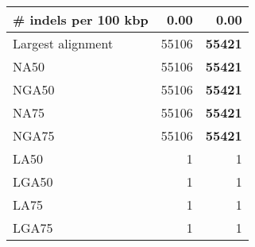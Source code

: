 \documentclass[12pt,a4paper]{article}
\begin{document}
\begin{table}[ht]
\begin{center}
\begin{tabular}{|l*{2}{|r}|}
\# indels per 100 kbp & 0.00 & 0.00 \\ \hline
Largest alignment & 55106 & {\bf 55421} \\ \hline
NA50 & 55106 & {\bf 55421} \\ \hline
NGA50 & 55106 & {\bf 55421} \\ \hline
NA75 & 55106 & {\bf 55421} \\ \hline
NGA75 & 55106 & {\bf 55421} \\ \hline
LA50 & 1 & 1 \\ \hline
LGA50 & 1 & 1 \\ \hline
LA75 & 1 & 1 \\ \hline
LGA75 & 1 & 1 \\ \hline
\end{tabular}
\end{center}
\end{table}
\end{document}
